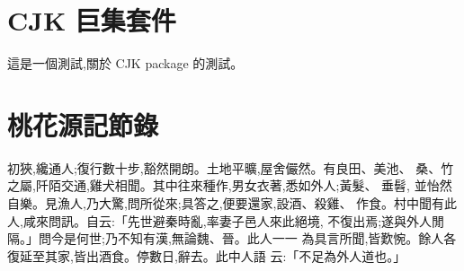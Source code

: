 \documentclass{article}
\begin{document}
\begin{CJK*}{UTF8}{bsmi}
\section{CJK 巨集套件}
這是一個測試,關於 CJK package 的測試。
\section{桃花源記節錄}
初狹,纔通人;復行數十步,豁然開朗。土地平曠,屋舍儼然。有良田、美池、%
桑、竹之屬,阡陌交通,雞犬相聞。其中往來種作,男女衣著,悉如外人;黃髮、%
垂髫, 並怡然自樂。見漁人,乃大驚,問所從來;具答之,便要還家,設酒、殺雞、%
作食。村中聞有此人,咸來問訊。自云:「先世避秦時亂,率妻子邑人來此絕境,%
不復出焉;遂與外人閒隔。」問今是何世;乃不知有漢,無論魏、晉。此人一一%
為具言所聞,皆歎惋。餘人各復延至其家,皆出酒食。停數日,辭去。此中人語%
云:「不足為外人道也。」
\end{CJK*}
\end{document}
